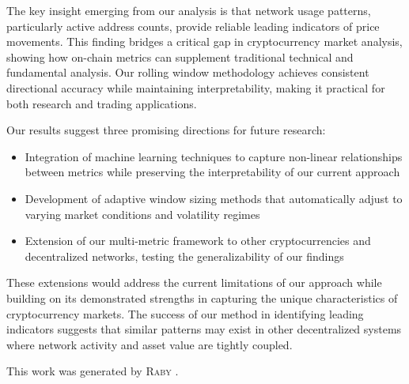 \documentclass{article} %
\begin{document}
The key insight emerging from our analysis is that network usage patterns, particularly active address counts, provide reliable leading indicators of price movements. This finding bridges a critical gap in cryptocurrency market analysis, showing how on-chain metrics can supplement traditional technical and fundamental analysis. Our rolling window methodology achieves consistent directional accuracy while maintaining interpretability, making it practical for both research and trading applications.

Our results suggest three promising directions for future research:
\begin{itemize}
    \item Integration of machine learning techniques to capture non-linear relationships between metrics while preserving the interpretability of our current approach
    \item Development of adaptive window sizing methods that automatically adjust to varying market conditions and volatility regimes
    \item Extension of our multi-metric framework to other cryptocurrencies and decentralized networks, testing the generalizability of our findings
\end{itemize}

These extensions would address the current limitations of our approach while building on its demonstrated strengths in capturing the unique characteristics of cryptocurrency markets. The success of our method in identifying leading indicators suggests that similar patterns may exist in other decentralized systems where network activity and asset value are tightly coupled.

This work was generated by \textsc{Raby} \citep{paperraby}.



\end{document}
